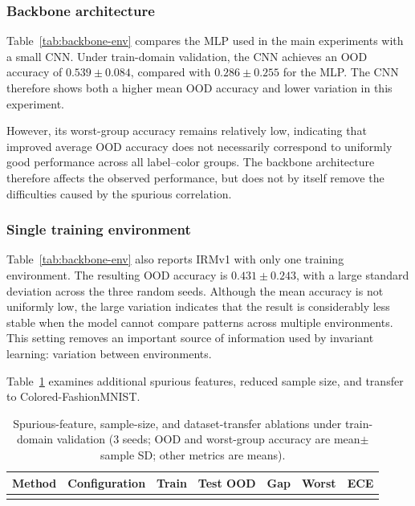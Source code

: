 \documentclass[12pt,a4paper]{article}
\begin{document}
\subsubsection{Backbone architecture}
Table~\ref{tab:backbone-env} compares the MLP used in the main experiments with a small CNN. Under
train-domain validation, the CNN achieves an OOD accuracy of
$0.539\pm0.084$, compared with $0.286\pm0.255$ for the MLP. The CNN therefore shows
both a higher mean OOD accuracy and lower variation in this experiment.

However, its worst-group accuracy remains relatively low, indicating that improved
average OOD accuracy does not necessarily correspond to uniformly good performance
across all label--color groups. The backbone architecture therefore affects the
observed performance, but does not by itself remove the difficulties caused by the
spurious correlation.

\subsubsection{Single training environment}
Table~\ref{tab:backbone-env} also reports IRMv1 with only one training environment. The resulting
OOD accuracy is $0.431\pm0.243$, with a large standard deviation across the three
random seeds. Although the mean accuracy is not uniformly low, the large variation
indicates that the result is considerably less stable when the model cannot compare
patterns across multiple environments. This setting removes an important source of
information used by invariant learning: variation between environments.

Table~\ref{tab:robust-transfer} examines additional spurious features,
reduced sample size, and transfer to Colored-FashionMNIST.

\begin{table}[!htbp]
\centering
\small
\setlength{\tabcolsep}{4pt}
\caption[Spurious features, sample size, and dataset transfer]{Spurious-feature, sample-size, and dataset-transfer ablations under train-domain validation
(3 seeds; OOD and worst-group accuracy are mean$\pm$sample SD; other metrics are means).}
\label{tab:robust-transfer}
\setlength{\tabcolsep}{4pt}
\begin{tabular}{llccccc}
\toprule
Method & Configuration & Train & Test OOD & Gap & Worst & ECE \\
\midrule

\\
\bottomrule
\end{tabular}
\end{table}
\end{document}
